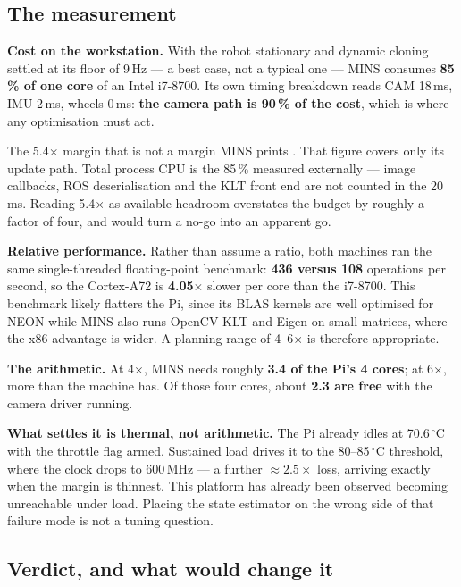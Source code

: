 \subsection{The measurement}

\noindent \textbf{Cost on the workstation.} With the robot stationary and
dynamic cloning settled at its floor of 9\,Hz --- a best case, not a typical
one --- MINS consumes \textbf{85\,\% of one core} of an Intel i7-8700. Its own
timing breakdown reads CAM 18\,ms, IMU 2\,ms, wheels 0\,ms: \textbf{the camera
path is 90\,\% of the cost}, which is where any optimisation must act.

\begin{trapbox}{The 5.4$\times$ margin that is not a margin}
MINS prints . That figure covers only its
update path. Total process CPU is the 85\,\% measured externally --- image
callbacks, ROS deserialisation and the KLT front end are not counted in the
20\,ms. Reading 5.4$\times$ as available headroom overstates the budget by
roughly a factor of four, and would turn a no-go into an apparent go.
\end{trapbox}

\noindent \textbf{Relative performance.} Rather than assume a ratio, both
machines ran the same single-threaded floating-point benchmark: \textbf{436
versus 108} operations per second, so the Cortex-A72 is \textbf{4.05$\times$}
slower per core than the i7-8700. This benchmark likely flatters the Pi, since
its BLAS kernels are well optimised for NEON while MINS also runs OpenCV KLT
and Eigen on small matrices, where the x86 advantage is wider. A planning range
of 4--6$\times$ is therefore appropriate.

\noindent \textbf{The arithmetic.} At 4$\times$, MINS needs roughly
\textbf{3.4 of the Pi's 4 cores}; at 6$\times$, more than the machine has. Of
those four cores, about \textbf{2.3 are free} with the camera driver running.

\noindent \textbf{What settles it is thermal, not arithmetic.} The Pi already
idles at 70.6\,$^\circ$C with the throttle flag armed. Sustained load
drives it to the 80--85\,$^\circ$C threshold, where the clock drops
to 600\,MHz --- a further $\approx2.5\times$ loss, arriving exactly when the
margin is thinnest. This platform has already been observed becoming
unreachable under load. Placing the state estimator on the wrong side of that
failure mode is not a tuning question.

\subsection{Verdict, and what would change it}

